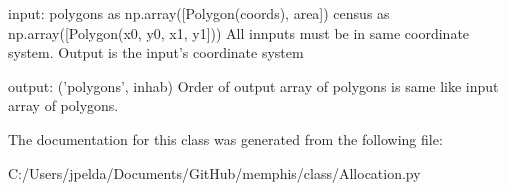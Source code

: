 \begin{DoxyVerb}input:   polygons as np.array([Polygon(coords), area])
 census as np.array([Polygon(x0, y0, x1, y1]))
All innputs must be in same coordinate system. Output is the input's
coordinate system

output:  ('polygons', inhab)
Order of output array of polygons is same like input array of polygons.
\end{DoxyVerb}
 

The documentation for this class was generated from the following file\+:\begin{DoxyCompactItemize}
\item 
C\+:/\+Users/jpelda/\+Documents/\+Git\+Hub/memphis/class/Allocation.\+py\end{DoxyCompactItemize}
